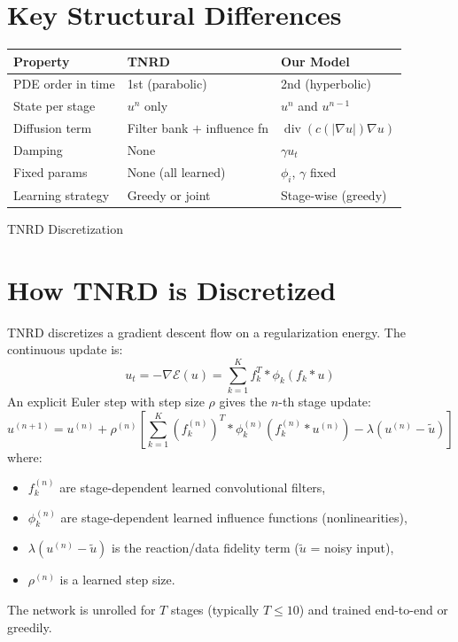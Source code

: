 \documentclass{report}
\begin{document}
\pagebreak




\section*{Key Structural Differences}

\begin{center}
	\begin{tabular}{lll}
		\hline
		\textbf{Property} & \textbf{TNRD}                & \textbf{Our Model}                          \\
		\hline
		PDE order in time & 1st (parabolic)              & 2nd (hyperbolic)                            \\
		State per stage   & $u^n$ only                   & $u^n$ and $u^{n-1}$                         \\
		Diffusion term    & Filter bank $+$ influence fn & $\operatorname{div}(c(|\nabla u|)\nabla u)$ \\
		Damping           & None                         & $\gamma u_t$                                \\
		Fixed params      & None (all learned)           & $\phi_i$, $\gamma$ fixed                    \\
		Learning strategy & Greedy or joint              & Stage-wise (greedy)                         \\
		\hline
	\end{tabular}
\end{center}

{\huge TNRD Discretization}

\section*{How TNRD is Discretized}

TNRD discretizes a gradient descent flow on a regularization energy. The continuous update is:
\begin{equation}
	u_t = -\nabla \mathcal{E}(u) = \sum_{k=1}^{K} f_k^T * \phi_k(f_k * u)
\end{equation}
An explicit Euler step with step size $\rho$ gives the $n$-th stage update:
\begin{equation}
	u^{(n+1)} = u^{(n)} + \rho^{(n)} \left[
	\sum_{k=1}^{K} \left(f_k^{(n)}\right)^T * \phi_k^{(n)}\!\left(f_k^{(n)} * u^{(n)}\right)
	- \lambda(u^{(n)} - \tilde{u})
	\right]
\end{equation}
where:
\begin{itemize}
	\item $f_k^{(n)}$ are stage-dependent learned convolutional filters,
	\item $\phi_k^{(n)}$ are stage-dependent learned influence functions (nonlinearities),
	\item $\lambda(u^{(n)} - \tilde{u})$ is the reaction/data fidelity term ($\tilde{u}$ = noisy input),
	\item $\rho^{(n)}$ is a learned step size.
\end{itemize}
The network is unrolled for $T$ stages (typically $T \leq 10$) and trained end-to-end or greedily.
\end{document}

